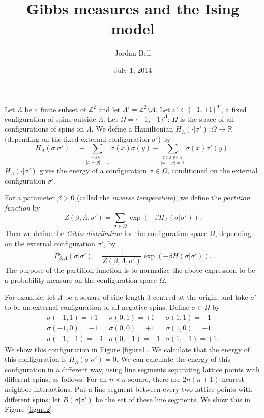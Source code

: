 \documentclass{article}
\begin{document}
\title{Gibbs measures and the Ising model}
\author{Jordan Bell}
\date{July 1, 2014}
\maketitle

Let $\Lambda$ be a finite subset of $\mathbb{Z}^2$ and let $\Lambda'=\mathbb{Z}^2 \setminus \Lambda$. Let $\sigma' \in \{-1,+1\}^{\Lambda'}$, a fixed configuration of spins
outside $\Lambda$. Let $\Omega=\{-1,+1\}^\Lambda$; $\Omega$ is the space of all configurations of spins on $\Lambda$. We define a Hamiltonian $H_\Lambda(\cdot| \sigma') : \Omega \to \mathbb{R}$ (depending on the fixed external configuration $\sigma'$) by
\[
H_\Lambda(\sigma | \sigma')=-\sum_{\stackrel{x,y \in \Lambda}{|x-y|=1}} \sigma(x)\sigma(y)-\sum_{\stackrel{x \in \Lambda, y \in \Lambda'}{|x-y|=1}} \sigma(x) \sigma'(y).
\]
$H_\Lambda(\cdot | \sigma')$ gives the energy of a configuration $\sigma \in \Omega$, conditioned on the external configuration $\sigma'$.

For a parameter $\beta>0$ (called the {\em inverse temperature}), we define the {\em partition function} by
\[
Z(\beta,\Lambda,\sigma')=\sum_{\sigma \in \Omega} \exp(-\beta H_\Lambda(\sigma|\sigma')).
\]
Then we define the {\em Gibbs distribution} for the configuration space $\Omega$, depending on the external configuration $\sigma'$, by
\[
P_{\beta,\Lambda}(\sigma|\sigma')=\frac{1}{Z(\beta,\Lambda,\sigma')} \exp(-\beta H(\sigma|\sigma')).
\]
The purpose of the partition function is to normalize the above expression to be a probability measure on the configuration space $\Omega$.

For example, let $\Lambda$ be a square of side length $3$ centred at the origin, and take $\sigma'$ to be an external configuration of all negative spins. Define $\sigma \in \Omega$ by
\[
\begin{array}{lll}
\sigma(-1,1)=+1& \sigma(0,1)=+1 & \sigma(1,1)=-1\\
\sigma(-1,0)=-1 & \sigma(0,0)=+1 & \sigma(1,0)=-1\\
\sigma(-1,-1)=-1 & \sigma(0,-1)=-1 & \sigma(1,-1)=+1.
\end{array}
\]
We show this configuration in Figure \ref{figure1}. We calculate that the energy of this configuration is $H_\Lambda(\sigma|\sigma')=0$. We can calculate the energy of this configuration in a different way, using line segments separating lattice points with different spins, as follows. For an $n \times n$ square, there are $2n(n+1)$ nearest neighbor interactions. Put a line segment between every two 
lattice points with different spins; let $B(\sigma|\sigma')$ be the set of these line segments. We show this in Figure \ref{figure2}.
\end{document}
